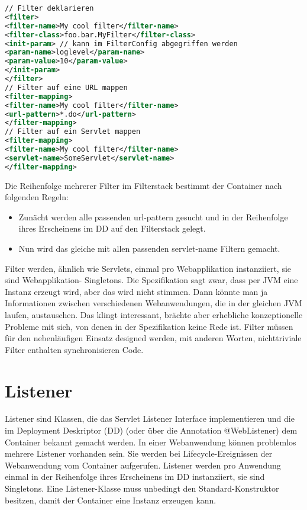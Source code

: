 \documentclass[a4paper,10pt]{scrreprt}
\begin{document}
\begin{lstlisting}[caption=Filter Beispiel,language=xml] 
 // Filter deklarieren
<filter>
<filter-name>My cool filter</filter-name>
<filter-class>foo.bar.MyFilter</filter-class>
<init-param> // kann im FilterConfig abgegriffen werden
<param-name>loglevel</param-name>
<param-value>10</param-value>
</init-param>
</filter>
// Filter auf eine URL mappen
<filter-mapping>
<filter-name>My cool filter</filter-name>
<url-pattern>*.do</url-pattern>
</filter-mapping>
// Filter auf ein Servlet mappen
<filter-mapping>
<filter-name>My cool filter</filter-name>
<servlet-name>SomeServlet</servlet-name>
</filter-mapping>
\end{lstlisting}
Die Reihenfolge mehrerer Filter im Filterstack bestimmt der Container nach folgenden Regeln:
\begin{itemize}
\item  Zunächt werden alle passenden url-pattern gesucht und in der Reihenfolge ihres
Erscheinens im DD auf den Filterstack gelegt.
\item  Nun wird das gleiche mit allen passenden servlet-name Filtern gemacht.
\end{itemize}

Filter werden, ähnlich wie Servlets, einmal pro Webapplikation instanziiert, sie sind Webapplikation-
Singletons. Die Spezifikation sagt zwar, dass per JVM eine Instanz erzeugt wird, aber das wird nicht
stimmen. Dann könnte man ja Informationen zwischen verschiedenen Webanwendungen, die in der
gleichen JVM laufen, austauschen. Das klingt interessant, brächte aber erhebliche konzeptionelle
Probleme mit sich, von denen in der Spezifikation keine Rede ist. Filter müssen für den
nebenläufigen Einsatz designed werden, mit anderen Worten, nichttriviale Filter enthalten
synchronisieren Code.


\section{Listener}
Listener sind Klassen, die das Servlet Listener Interface implementieren und die im Deployment
Deskriptor (DD) (oder über die Annotation @WebListener) dem Container bekannt gemacht werden.
In einer Webanwendung können problemlos mehrere Listener vorhanden sein. Sie werden bei
Lifecycle-Ereignissen der Webanwendung vom Container aufgerufen. Listener werden pro
Anwendung einmal in der Reihenfolge ihres Erscheinens im DD instanziiert, sie sind Singletons.
Eine Listener-Klasse muss unbedingt den Standard-Konstruktor besitzen, damit der Container eine
Instanz erzeugen kann.
\end{document}
